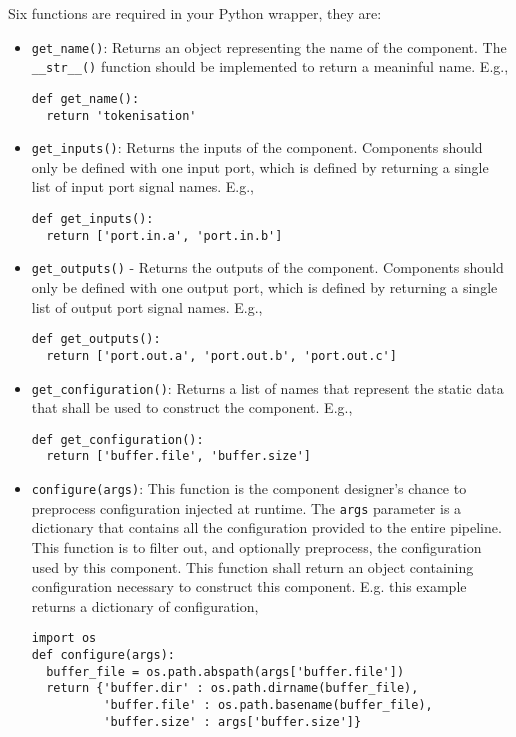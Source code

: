 Six functions are required in your Python wrapper, they are:
\begin{itemize}
\item \texttt{get\_name()}: Returns an object representing the name of the component. The \texttt{\_\_str\_\_()} function should be implemented to return a meaninful name. E.g.,
\begin{verbatim}
def get_name():
  return 'tokenisation'
\end{verbatim}
\item \texttt{get\_inputs()}: Returns the inputs of the component. Components should only be defined with one input port, which is defined by returning a single list of input port signal names. E.g.,
\begin{verbatim}
def get_inputs():
  return ['port.in.a', 'port.in.b']
\end{verbatim}
\item \texttt{get\_outputs()} - Returns the outputs of the component. Components should only be defined with one output port, which is defined by returning a single list of output port signal names. E.g.,
\begin{verbatim}
def get_outputs():
  return ['port.out.a', 'port.out.b', 'port.out.c']
\end{verbatim}
\item \texttt{get\_configuration()}: Returns a list of names that represent the static data that shall be used to construct the component. E.g.,
\begin{verbatim}
def get_configuration():
  return ['buffer.file', 'buffer.size']
\end{verbatim}
\item \texttt{configure(args)}: This function is the component designer's chance to preprocess configuration injected at runtime. The \texttt{args} parameter is a dictionary that contains all the configuration provided to the entire pipeline. This function is to filter out, and optionally preprocess, the configuration used by this component. This function shall return an object containing configuration necessary to construct this component. E.g. this example returns a dictionary of configuration,
\begin{verbatim}
import os
def configure(args):
  buffer_file = os.path.abspath(args['buffer.file'])
  return {'buffer.dir' : os.path.dirname(buffer_file),
          'buffer.file' : os.path.basename(buffer_file),
          'buffer.size' : args['buffer.size']}
\end{verbatim}

\end{itemize}
